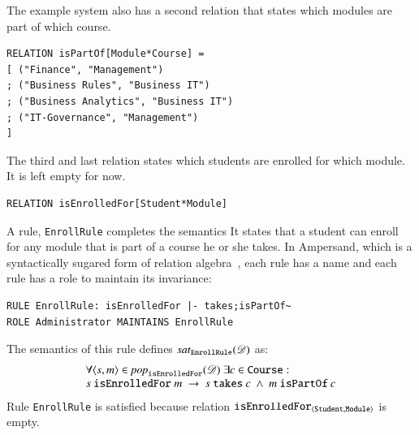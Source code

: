 \documentclass{elsarticle}
\begin{document}
   The example system also has a second relation that states which modules are part of which course.
\begin{verbatim}
RELATION isPartOf[Module*Course] =
[ ("Finance", "Management")
; ("Business Rules", "Business IT")
; ("Business Analytics", "Business IT")
; ("IT-Governance", "Management")
]
\end{verbatim}
   The third and last relation states which students are enrolled for which module.
   It is left empty for now.
\begin{verbatim}
RELATION isEnrolledFor[Student*Module]
\end{verbatim}

   A rule, {\tt EnrollRule} completes the semantics
   It states that a student can enroll for any module that is part of a course he or she takes.
   In Ampersand, which is a syntactically sugared form of relation algebra~\cite{JoostenRAMiCS2017},
   each rule has a name and each rule has a role to maintain its invariance:
\begin{verbatim}
RULE EnrollRule: isEnrolledFor |- takes;isPartOf~
ROLE Administrator MAINTAINS EnrollRule
\end{verbatim}
   The semantics of this rule defines $\text{\it sat\/}_{\tt EnrollRule}(\mathscr{D})$ as:
\begin{equation}
   \begin{array}{l}
   \forall \pair{s}{m}\in\pop{\tt isEnrolledFor}{\dataset}\ \exists c\in\text{\tt Course}:\\
s\ \text{\tt isEnrolledFor}\ m\ \rightarrow\ s\ \text{\tt takes}\ c\ \wedge\ m\ \text{\tt isPartOf}\ c
\end{array}
\label{eqn:example isEnrolledFor}
\end{equation}
   Rule {\tt EnrollRule} is satisfied because relation $\text{\it \tt isEnrolledFor\/}_{\langle{\tt Student},{\tt Module}\rangle}$ is empty.
\end{document}
